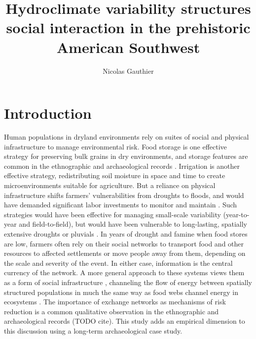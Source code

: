 \documentclass[11pt]{wlscirep}
\title{Hydroclimate variability structures social interaction in the prehistoric American Southwest}
\author[1,*]{Nicolas Gauthier}
\affil[1]{School of Human Evolution and Social Change, 900 S Caddy Mall, Tempe, USA}
\affil[*]{Nicolas.Gauthier@asu.edu}
\begin{document}
\flushbottom
\maketitle


\thispagestyle{empty}


\section*{Introduction}
Human populations in dryland environments rely on suites of social and physical infrastructure to manage environmental risk. Food storage is one effective strategy for preserving bulk grains in dry environments, and storage features are common in the ethnographic and archaeological records \cite{Spielmann2011SustainableEnvironments}. Irrigation is another effective strategy, redistributing soil moisture in space and time to create microenvironments suitable for agriculture. But a reliance on physical infrastructure shifts farmers' vulnerabilities from droughts to floods, and would have demanded significant labor investments to monitor and maintain \cite{Dominguez2005}. Such strategies would have been effective for managing small-scale variability (year-to-year and field-to-field), but would have been vulnerable to long-lasting, spatially extensive droughts or pluvials \cite{Halstead1989}. In years of drought and famine when food stores are low, farmers often rely on their social networks to transport food and other resources to affected settlements or move people away from them, depending on the scale and severity of the event. In either case, information is the central currency of the network. A more general approach to these systems views them as a form of social infrastructure \cite{STRAWHACKER2015}, channeling the flow of energy between spatially structured populations in much the same way as food webs channel energy in ecosystems \cite{Crabtree2015,Crabtree2017ReconstructingStates}. The importance of exchange networks as mechanisms of risk reduction is a common qualitative observation in the ethnographic and archaeological records (TODO cite). This study adds an empirical dimension to this discussion using a long-term archaeological case study.%
\end{document}
